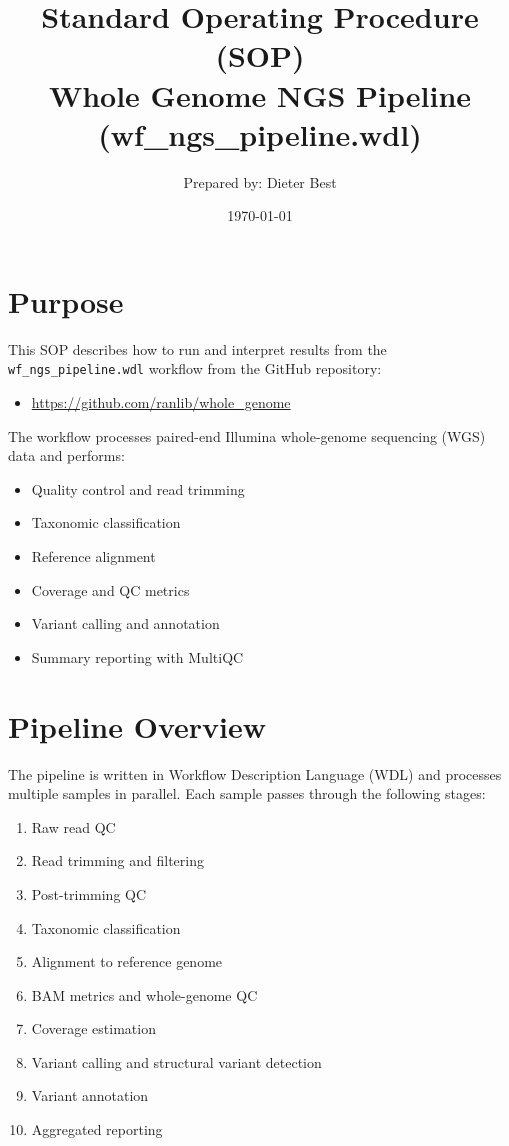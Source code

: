 \documentclass[13pt,letter]{article}
\title{Standard Operating Procedure (SOP)\\
Whole Genome NGS Pipeline (wf\_ngs\_pipeline.wdl)}
\author{Prepared by: Dieter Best}
\date{\today}
\begin{document}
\maketitle
\tableofcontents
\newpage

\section{Purpose}

This SOP describes how to run and interpret results from the \texttt{wf\_ngs\_pipeline.wdl} workflow from the GitHub repository:

\begin{itemize}
  \item \url{https://github.com/ranlib/whole_genome}
\end{itemize}

The workflow processes paired-end Illumina whole-genome sequencing (WGS) data and performs:

\begin{itemize}
  \item Quality control and read trimming
  \item Taxonomic classification
  \item Reference alignment
  \item Coverage and QC metrics
  \item Variant calling and annotation
  \item Summary reporting with MultiQC
\end{itemize}

\section{Pipeline Overview}

The pipeline is written in Workflow Description Language (WDL) and processes multiple samples in parallel. Each sample passes through the following stages:

\begin{enumerate}
  \item Raw read QC
  \item Read trimming and filtering
  \item Post-trimming QC
  \item Taxonomic classification
  \item Alignment to reference genome
  \item BAM metrics and whole-genome QC
  \item Coverage estimation
  \item Variant calling and structural variant detection
  \item Variant annotation
  \item Aggregated reporting
\end{enumerate}
\end{document}
